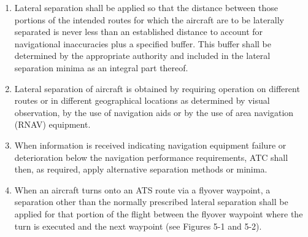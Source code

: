 \begin{enumeratesc}
    \begin{enumerate}
        \item Lateral separation shall be applied so that the distance between those portions of the intended routes for which the aircraft are to be laterally separated is never less than an established distance to account for navigational inaccuracies plus a specified buffer. This buffer shall be determined by the appropriate authority and included in the lateral separation minima as an integral part thereof.
        \item Lateral separation of aircraft is obtained by requiring operation on different routes or in different geographical locations as determined by visual observation, by the use of navigation aids or by the use of area navigation (RNAV) equipment.
        \item When information is received indicating navigation equipment failure or deterioration below the navigation performance requirements, ATC shall then, as required, apply alternative separation methods or minima.
        \item When an aircraft turns onto an ATS route via a flyover waypoint, a separation other than the normally prescribed lateral separation shall be applied for that portion of the flight between the flyover waypoint where the turn is executed and the next waypoint (see Figures 5-1 and 5-2).
    \end{enumerate}



\end{enumeratesc}

